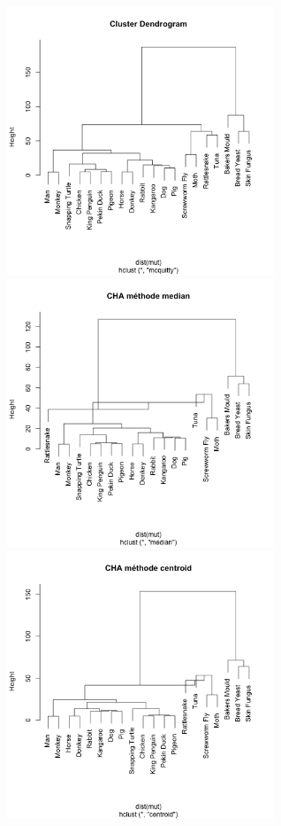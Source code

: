 \documentclass[10pt]{article}
\begin{document}
	\includegraphics[height = 8cm, width = 8cm]{Figures/HClust/hclust_Mutations_mcq.png}\\
	\includegraphics[height = 8cm, width = 8cm]{Figures/HClust/hclust_Mutations_mdn.png}
	\includegraphics[height = 8cm, width = 8cm]{Figures/HClust/hclust_Mutations_ctr.png}\\
\end{document}
